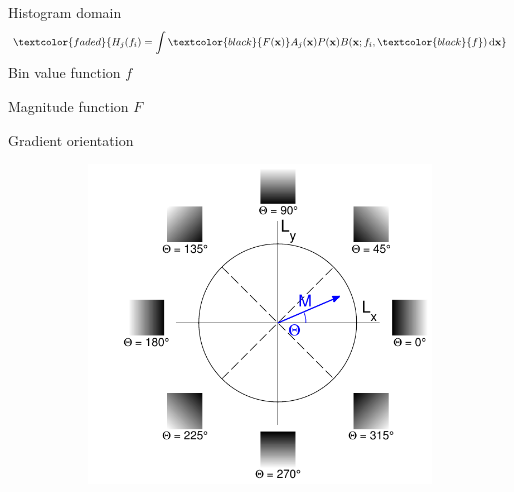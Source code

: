 \documentclass[14pt,t]{beamer}
\def\x{\mathbf{x}}
\begin{document}
%
\begin{frame}{Histogram domain}
\begin{align*}
\textcolor{faded}{H_j(f_i) = \int \textcolor{black}{F(\x)} A_j (\x) P (\x) B(\x; f_i,\textcolor{black}{f}) \,\text{d} \x}
\end{align*}
Bin value function $f$

Magnitude function $F$
\end{frame}
%
\begin{frame}{Gradient orientation}
\begin{figure}
\centering
	\begin{subfigure}[t]{0.75\textwidth}
		\includegraphics[width=\textwidth]{../report/img/gradientOrientationTheory.pdf}
	\end{subfigure}
\end{figure}
\end{frame}
%
\end{document}
